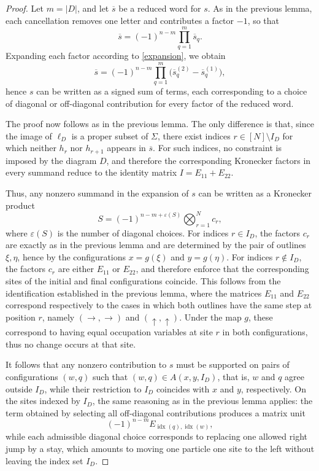 \documentclass{article}
\begin{document}
\begin{proof}

Let \(m=|D|\),  and let \(\overline{s}\) be a reduced word for \(s\). As in the previous lemma, each cancellation removes one letter and contributes a factor \(-1\), so that
\[
\overline{s}=(-1)^{n-m}\prod_{q=1}^{m}\overline{s}_q .
\]
Expanding each factor according to \eqref{expansion}, we obtain
\[
\overline{s}=(-1)^{n-m}\prod_{q=1}^{m}\bigl(\overline{s}_q^{(2)}-\overline{s}_q^{(1)}\bigr),
\]
hence \(s\) can be written as a signed sum of terms, each corresponding to a choice of diagonal or off-diagonal contribution for every factor of the reduced word.

The proof now follows as in the previous lemma. The only difference is that, since the image of \(\ell_D\) is a proper subset of \(\Sigma\), there exist indices \(r\in[N]\setminus I_D\) for which neither \(h_r\) nor \(h_{r+1}\) appears in \(\overline{s}\). For such indices, no constraint is imposed by the diagram \(D\), and therefore the corresponding Kronecker factors in every summand reduce to the identity matrix \(I=E_{11}+E_{22}\).

Thus, any nonzero summand in the expansion of \(s\) can be written as a Kronecker product
\[
S=(-1)^{n-m+\varepsilon(S)}\bigotimes_{r=1}^{N}c_r,
\]
where \(\varepsilon(S)\) is the number of diagonal choices. For indices \(r\in I_D\), the factors \(c_r\) are exactly as in the previous lemma and are determined by the pair of outlines \(\xi,\eta\), hence by the configurations \(x=g(\xi)\) and \(y=g(\eta)\). For indices \(r\notin I_D\), the factors \(c_r\) are either \(E_{11}\) or \(E_{22}\), and therefore enforce that the corresponding sites of the initial and final configurations coincide. This follows from the identification established in the previous lemma, where the matrices \(E_{11}\) and \(E_{22}\) correspond respectively to the cases in which both outlines have the same step at position \(r\), namely \((\rightarrow,\rightarrow)\) and \((\uparrow,\uparrow)\). Under the map \(g\), these correspond to having equal occupation variables at site \(r\) in both configurations, thus no change occurs at that site.

It follows that any nonzero contribution to \(s\) must be supported on pairs of configurations \((w,q)\) such that \((w,q)\in A(x,y,I_D)\), that is, \(w\) and \(q\) agree outside \(I_D\), while their restriction to \(I_D\) coincides with \(x\) and \(y\), respectively. On the sites indexed by \(I_D\), the same reasoning as in the previous lemma applies: the term obtained by selecting all off-diagonal contributions produces a matrix unit
\[
(-1)^{n-m}E_{\operatorname{idx}(q),\operatorname{idx}(w)},
\]
while each admissible diagonal choice corresponds to replacing one allowed right jump by a stay, which amounts to moving one particle one site to the left without leaving the index set \(I_D\).


\end{proof}
\end{document}
